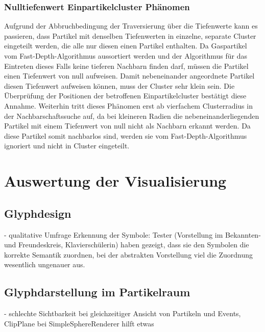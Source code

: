 \subsubsection*{Nulltiefenwert Einpartikelcluster Phänomen} %

Aufgrund der Abbruchbedingung der Traversierung über die Tiefenwerte kann es passieren, dass Partikel mit denselben Tiefenwerten in einzelne, separate Cluster eingeteilt werden, die alle nur diesen einen Partikel enthalten. Da Gaspartikel vom Fast-Depth-Algorithmus aussortiert werden und der Algorithmus für das Eintreten dieses Falls keine tieferen Nachbarn finden darf, müssen die Partikel einen Tiefenwert von null aufweisen. Damit nebeneinander angeordnete Partikel diesen Tiefenwert aufweisen können, muss der Cluster sehr klein sein. %
Die Überprüfung der Positionen der betroffenen Einpartikelcluster bestätigt diese Annahme. %
Weiterhin tritt dieses Phänomen erst ab vierfachem Clusterradius in der Nachbarschaftssuche auf, da bei kleineren Radien die nebeneinanderliegenden Partikel mit einem Tiefenwert von null nicht als Nachbarn erkannt werden. Da diese Partikel somit nachbarlos sind, werden sie vom Fast-Depth-Algorithmus ignoriert und nicht in Cluster eingeteilt.

\section{Auswertung der Visualisierung}

\subsection{Glyphdesign}
- qualitative Umfrage Erkennung der Symbole: Tester (Vorstellung im Bekannten- und Freundeskreis, Klavierschülerin) haben gezeigt, dass sie den Symbolen die korrekte Semantik zuordnen, bei der abstrakten Vorstellung viel die Zuordnung wesentlich ungenauer aus. %

\subsection{Glyphdarstellung im Partikelraum}

- schlechte Sichtbarkeit bei gleichzeitiger Ansicht von Partikeln und Events, ClipPlane bei SimpleSphereRenderer hilft etwas %


